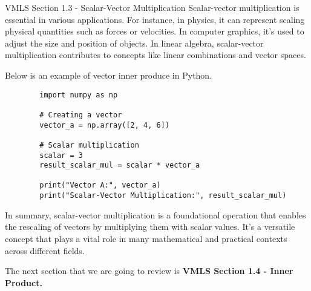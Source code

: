 \begin{notes}{VMLS Section 1.3 - Scalar-Vector Multiplication}
    Scalar-vector multiplication is essential in various applications. For instance, in physics, it can represent scaling physical quantities such as forces or velocities. In computer graphics, it's used to adjust the size 
    and position of objects. In linear algebra, scalar-vector multiplication contributes to concepts like linear combinations and vector spaces.

    \begin{Highlight}
        Below is an example of vector inner produce in Python.

        \begin{verbatim}
        import numpy as np

        # Creating a vector
        vector_a = np.array([2, 4, 6])
        
        # Scalar multiplication
        scalar = 3
        result_scalar_mul = scalar * vector_a
        
        print("Vector A:", vector_a)
        print("Scalar-Vector Multiplication:", result_scalar_mul)
        \end{verbatim}
    \end{Highlight}

    In summary, scalar-vector multiplication is a foundational operation that enables the rescaling of vectors by multiplying them with scalar values. It's a versatile concept that plays a vital role in many mathematical 
    and practical contexts across different fields.
\end{notes}

The next section that we are going to review is \textbf{VMLS Section 1.4 - Inner Product.}

